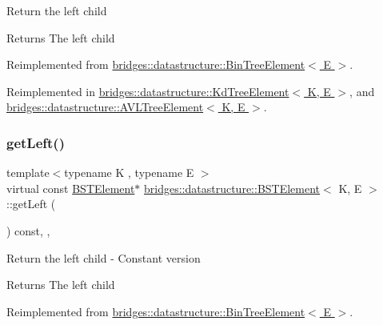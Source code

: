 Return the left child \begin{DoxyReturn}{Returns}
The left child 
\end{DoxyReturn}


Reimplemented from \hyperlink{classbridges_1_1datastructure_1_1_bin_tree_element_ab30cfe373892c52709d5f1df013a0c82}{bridges\+::datastructure\+::\+Bin\+Tree\+Element$<$ E $>$}.



Reimplemented in \hyperlink{classbridges_1_1datastructure_1_1_kd_tree_element_a875bfa2dfd88a7740f7bcd28a117c12a}{bridges\+::datastructure\+::\+Kd\+Tree\+Element$<$ K, E $>$}, and \hyperlink{classbridges_1_1datastructure_1_1_a_v_l_tree_element_ab05925e343b9fa71b61c71e8034e1293}{bridges\+::datastructure\+::\+A\+V\+L\+Tree\+Element$<$ K, E $>$}.

\mbox{\label{classbridges_1_1datastructure_1_1_b_s_t_element_abac324ef0b480420bd82ecfe4501d60d}} 
\subsubsection{\texorpdfstring{get\+Left()}{getLeft()}\hspace{0.1cm}{\footnotesize\ttfamily [2/2]}}
{\footnotesize\ttfamily template$<$typename K , typename E $>$ \\
virtual const \hyperlink{classbridges_1_1datastructure_1_1_b_s_t_element}{B\+S\+T\+Element}$\ast$ \hyperlink{classbridges_1_1datastructure_1_1_b_s_t_element}{bridges\+::datastructure\+::\+B\+S\+T\+Element}$<$ K, E $>$\+::get\+Left (\begin{DoxyParamCaption}{ }\end{DoxyParamCaption}) const\hspace{0.3cm}{\ttfamily [inline]}, {\ttfamily [override]}, {\ttfamily [virtual]}}

Return the left child -\/ Constant version

\begin{DoxyReturn}{Returns}
The left child 
\end{DoxyReturn}


Reimplemented from \hyperlink{classbridges_1_1datastructure_1_1_bin_tree_element_ae14a70e2d25ad62337c87059b0cadb48}{bridges\+::datastructure\+::\+Bin\+Tree\+Element$<$ E $>$}.



